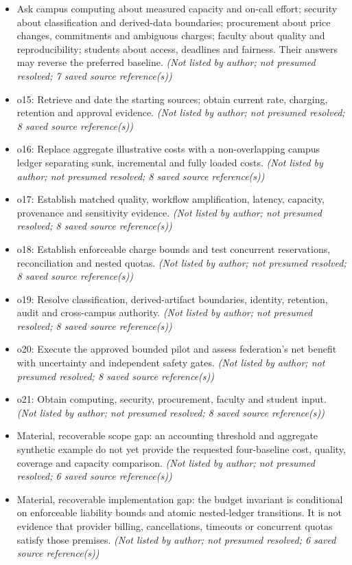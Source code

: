 \documentclass[11pt]{article}
\begin{document}
\begin{itemize}
\item Ask campus computing about measured capacity and on-call effort; security about classification and derived-data boundaries; procurement about price changes, commitments and ambiguous charges; faculty about quality and reproducibility; students about access, deadlines and fairness. Their answers may reverse the preferred baseline. \textit{ (Not listed by author; not presumed resolved; 7 saved source reference(s))}
\item o15: Retrieve and date the starting sources; obtain current rate, charging, retention and approval evidence. \textit{ (Not listed by author; not presumed resolved; 8 saved source reference(s))}
\item o16: Replace aggregate illustrative costs with a non-overlapping campus ledger separating sunk, incremental and fully loaded costs. \textit{ (Not listed by author; not presumed resolved; 8 saved source reference(s))}
\item o17: Establish matched quality, workflow amplification, latency, capacity, provenance and sensitivity evidence. \textit{ (Not listed by author; not presumed resolved; 8 saved source reference(s))}
\item o18: Establish enforceable charge bounds and test concurrent reservations, reconciliation and nested quotas. \textit{ (Not listed by author; not presumed resolved; 8 saved source reference(s))}
\item o19: Resolve classification, derived-artifact boundaries, identity, retention, audit and cross-campus authority. \textit{ (Not listed by author; not presumed resolved; 8 saved source reference(s))}
\item o20: Execute the approved bounded pilot and assess federation's net benefit with uncertainty and independent safety gates. \textit{ (Not listed by author; not presumed resolved; 8 saved source reference(s))}
\item o21: Obtain computing, security, procurement, faculty and student input. \textit{ (Not listed by author; not presumed resolved; 8 saved source reference(s))}
\item Material, recoverable scope gap: an accounting threshold and aggregate synthetic example do not yet provide the requested four-baseline cost, quality, coverage and capacity comparison. \textit{ (Not listed by author; not presumed resolved; 6 saved source reference(s))}
\item Material, recoverable implementation gap: the budget invariant is conditional on enforceable liability bounds and atomic nested-ledger transitions. It is not evidence that provider billing, cancellations, timeouts or concurrent quotas satisfy those premises. \textit{ (Not listed by author; not presumed resolved; 6 saved source reference(s))}

\end{itemize}
\end{document}
